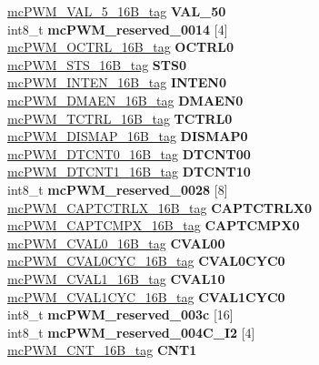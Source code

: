 \begin{DoxyCompactItemize}
\begin{tabbing}
\>\>\mbox{\hyperlink{unionmcPWM__VAL__5__16B__tag}{mcPWM\_VAL\_5\_16B\_tag}} {\bfseries VAL\_50}\\
\>\>int8\_t {\bfseries mcPWM\_reserved\_0014} \mbox{[}4\mbox{]}\\
\>\>\mbox{\hyperlink{unionmcPWM__OCTRL__16B__tag}{mcPWM\_OCTRL\_16B\_tag}} {\bfseries OCTRL0}\\
\>\>\mbox{\hyperlink{unionmcPWM__STS__16B__tag}{mcPWM\_STS\_16B\_tag}} {\bfseries STS0}\\
\>\>\mbox{\hyperlink{unionmcPWM__INTEN__16B__tag}{mcPWM\_INTEN\_16B\_tag}} {\bfseries INTEN0}\\
\>\>\mbox{\hyperlink{unionmcPWM__DMAEN__16B__tag}{mcPWM\_DMAEN\_16B\_tag}} {\bfseries DMAEN0}\\
\>\>\mbox{\hyperlink{unionmcPWM__TCTRL__16B__tag}{mcPWM\_TCTRL\_16B\_tag}} {\bfseries TCTRL0}\\
\>\>\mbox{\hyperlink{unionmcPWM__DISMAP__16B__tag}{mcPWM\_DISMAP\_16B\_tag}} {\bfseries DISMAP0}\\
\>\>\mbox{\hyperlink{unionmcPWM__DTCNT0__16B__tag}{mcPWM\_DTCNT0\_16B\_tag}} {\bfseries DTCNT00}\\
\>\>\mbox{\hyperlink{unionmcPWM__DTCNT1__16B__tag}{mcPWM\_DTCNT1\_16B\_tag}} {\bfseries DTCNT10}\\
\>\>int8\_t {\bfseries mcPWM\_reserved\_0028} \mbox{[}8\mbox{]}\\
\>\>\mbox{\hyperlink{unionmcPWM__CAPTCTRLX__16B__tag}{mcPWM\_CAPTCTRLX\_16B\_tag}} {\bfseries CAPTCTRLX0}\\
\>\>\mbox{\hyperlink{unionmcPWM__CAPTCMPX__16B__tag}{mcPWM\_CAPTCMPX\_16B\_tag}} {\bfseries CAPTCMPX0}\\
\>\>\mbox{\hyperlink{unionmcPWM__CVAL0__16B__tag}{mcPWM\_CVAL0\_16B\_tag}} {\bfseries CVAL00}\\
\>\>\mbox{\hyperlink{unionmcPWM__CVAL0CYC__16B__tag}{mcPWM\_CVAL0CYC\_16B\_tag}} {\bfseries CVAL0CYC0}\\
\>\>\mbox{\hyperlink{unionmcPWM__CVAL1__16B__tag}{mcPWM\_CVAL1\_16B\_tag}} {\bfseries CVAL10}\\
\>\>\mbox{\hyperlink{unionmcPWM__CVAL1CYC__16B__tag}{mcPWM\_CVAL1CYC\_16B\_tag}} {\bfseries CVAL1CYC0}\\
\>\>int8\_t {\bfseries mcPWM\_reserved\_003c} \mbox{[}16\mbox{]}\\
\>\>int8\_t {\bfseries mcPWM\_reserved\_004C\_I2} \mbox{[}4\mbox{]}\\
\>\>\mbox{\hyperlink{unionmcPWM__CNT__16B__tag}{mcPWM\_CNT\_16B\_tag}} {\bfseries CNT1}\\

\end{tabbing}
\end{DoxyCompactItemize}
